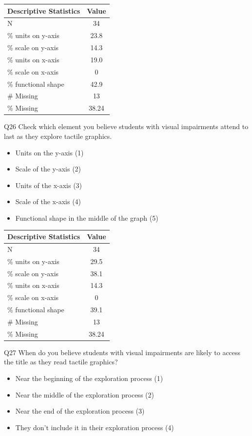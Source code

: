 \documentclass[11.5pt]{sig-alternate} %
\begin{document}
\begin{large}
\begin{table}[!h]
\centering
\begin{tabular}{lc}
Descriptive Statistics & Value\\ \hline
N & 34\\
\% units on y-axis & 23.8\\
\% scale on y-axis	& 14.3\\
\% units on x-axis	& 19.0\\
\% scale on x-axis &	0\\
\% functional shape &	42.9\\
\# Missing	& 13\\
\% Missing	& 38.24\\
\end{tabular}
\end{table}
\newpage

Q26 Check which element you believe students with visual impairments attend to last as they explore tactile graphics. 
\begin{itemize}
    \item 	Units on the y-axis (1)
    \item 	Scale of the y-axis (2)
    \item Units of the x-axis (3)
    \item 	Scale of the x-axis (4)
    \item 	Functional shape in the middle of the graph (5)
\end{itemize}

\begin{table}[!h]
\centering
\begin{tabular}{lc}
Descriptive Statistics & Value\\ \hline
N	& 34\\
\% units on y-axis	& 29.5\\
\% scale on y-axis	& 38.1\\
\% units on x-axis	& 14.3\\
\% scale on x-axis &	0\\
\% functional shape &	39.1\\
\# Missing	& 13\\
\% Missing	& 38.24\\
\end{tabular}
\end{table}

Q27 When do you believe students with visual impairments are likely to access the title as they read tactile graphics?  
\begin{itemize}
    \item Near the beginning of the exploration process (1)
    \item Near the middle of the exploration process (2)
    \item Near the end of the exploration process (3)
    \item They don’t include it in their exploration process (4)
\end{itemize}


\end{large}
\end{document}
